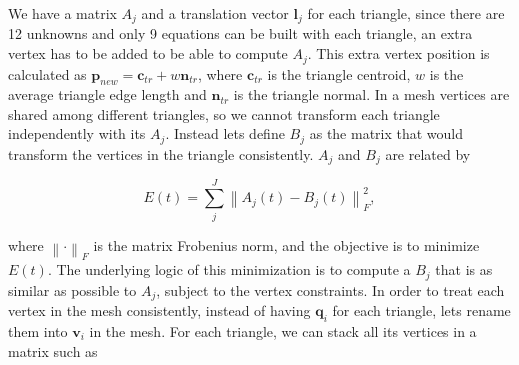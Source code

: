 \documentclass[12pt]{article}
\begin{document}
We have a matrix $A_{j}$ and a translation vector $\mathbf{l}_j$ for each triangle, since there are 12 unknowns and only 9 equations can be built with each triangle, an extra vertex has to be added to be able to compute $A_j$.
This extra vertex position is calculated as $\mathbf{p}_{new} = \mathbf{c}_{tr} + w\mathbf{n}_{tr}$, where $\mathbf{c}_{tr}$ is the triangle centroid, $w$ is the average triangle edge length and $\mathbf{n}_{tr}$ is the triangle normal. 
In a mesh vertices are shared among different triangles, so we cannot transform each triangle independently with its $A_j$.
Instead lets define $B_{j}$ as the matrix that would transform the vertices in the triangle consistently.
$A_j$ and $B_j$ are related by

\begin{equation*}
E(t) = \sum_{j}^J \left \| A_j(t) - B_j(t) \right \|^2_F,
\end{equation*}

where $\left \| \cdot \right \|_F$ is the matrix Frobenius norm, and the objective is to minimize $E(t)$.
The underlying logic of this minimization is to compute a $B_j$ that is as similar as possible to $A_j$, subject to the vertex constraints.
In order to treat each vertex in the mesh consistently, instead of having $\mathbf{q}_i$ for each triangle, lets rename them into $\mathbf{v}_i$ in the mesh.
For each triangle, we can stack all its vertices in a matrix such as
\end{document}
